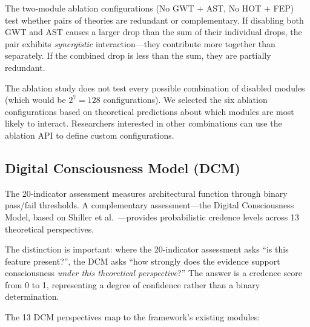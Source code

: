 The two-module ablation configurations (No GWT + AST, No HOT + FEP) test whether pairs of theories are redundant or complementary. If disabling both GWT and AST causes a larger drop than the sum of their individual drops, the pair exhibits \textit{synergistic} interaction---they contribute more together than separately. If the combined drop is less than the sum, they are partially redundant.

The ablation study does not test every possible combination of disabled modules (which would be $2^7 = 128$ configurations). We selected the six ablation configurations based on theoretical predictions about which modules are most likely to interact. Researchers interested in other combinations can use the ablation API to define custom configurations.

\subsection{Digital Consciousness Model (DCM)}

The 20-indicator assessment measures architectural function through binary pass/fail thresholds. A complementary assessment---the Digital Consciousness Model, based on Shiller et al.\ \cite{shiller2026}---provides probabilistic credence levels across 13 theoretical perspectives.

The distinction is important: where the 20-indicator assessment asks ``is this feature present?'', the DCM asks ``how strongly does the evidence support consciousness \textit{under this theoretical perspective}?'' The answer is a credence score from 0 to 1, representing a degree of confidence rather than a binary determination.

The 13 DCM perspectives map to the framework's existing modules:

